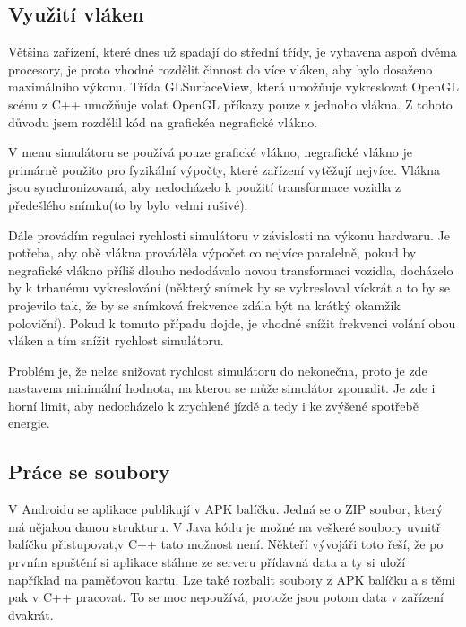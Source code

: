 \documentclass[11pt,twoside,a4paper]{book}
\begin{document}
\subsection{Využití vláken}
Většina zařízení, které dnes už spadají do střední třídy, je vybavena aspoň dvěma procesory, je proto vhodné rozdělit činnost do více vláken, aby bylo dosaženo maximálního výkonu. Třída GLSurfaceView, která umožňuje vykreslovat OpenGL scénu z C++ umožňuje volat OpenGL příkazy pouze z jednoho vlákna. Z tohoto důvodu jsem rozdělil kód na grafické\linebreak a negrafické vlákno.

V menu simulátoru se používá pouze grafické vlákno, negrafické vlákno je primárně použito pro fyzikální výpočty, které zařízení vytěžují nejvíce. Vlákna jsou synchronizovaná, aby nedocházelo k použití transformace vozidla z předešlého snímku(to by bylo velmi rušivé).

Dále provádím regulaci rychlosti simulátoru v závislosti na výkonu hardwaru. Je potřeba, aby obě vlákna prováděla výpočet co nejvíce paralelně, pokud by negrafické vlákno příliš dlouho nedodávalo novou transformaci vozidla, docházelo by k trhanému vykreslování (některý snímek by se vykresloval víckrát a to by se projevilo tak, že by se snímková frekvence zdála být na krátký okamžik poloviční). Pokud k tomuto případu dojde, je vhodné snížit frekvenci volání obou vláken a tím snížit rychlost simulátoru.

Problém je, že nelze snižovat rychlost simulátoru do nekonečna, proto je zde nastavena minimální hodnota, na kterou se může simulátor zpomalit. Je zde i horní limit, aby nedocházelo k zrychlené jízdě a tedy i ke zvýšené spotřebě energie.

\subsection{Práce se soubory}
V Androidu se aplikace publikují v APK balíčku. Jedná se o ZIP soubor, který má nějakou danou strukturu. V Java kódu je možné na veškeré soubory uvnitř balíčku přistupovat,\linebreak v C++ tato možnost není. Někteří vývojáři toto řeší, že po prvním spuštění si aplikace stáhne ze serveru přídavná data a ty si uloží například na paměťovou kartu. Lze také rozbalit soubory z APK balíčku a s těmi pak v C++ pracovat. To se moc nepoužívá, protože jsou potom data v zařízení dvakrát.
\end{document}

